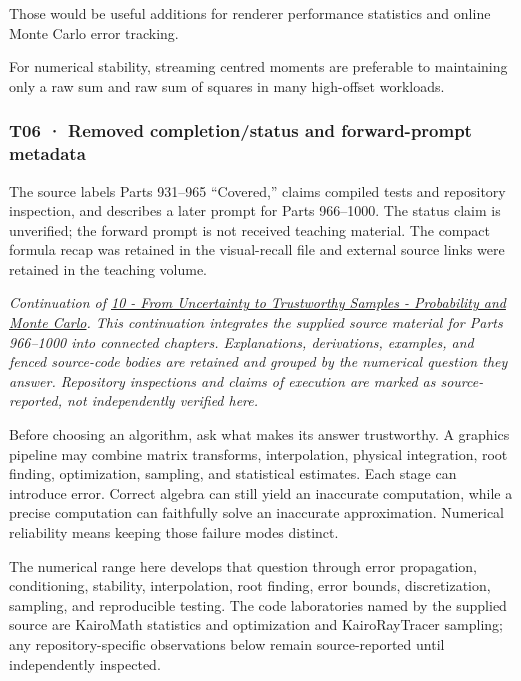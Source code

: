 Those would be useful additions for renderer performance statistics and online Monte Carlo error tracking.

For numerical stability, streaming centred moments are preferable to maintaining only a raw sum and raw sum of squares in many high-offset workloads.

\subsubsection{T06 · Removed completion/status and forward-prompt metadata}\label{02-foundations-ii-ch039-t06-removed-completionstatus-and-forward-prompt-metadata}

\hypertarget{02-foundations-ii-ch039-t06-removed-completionstatus-and-forward-prompt-metadata}{}

The source labels Parts 931--965 ``Covered,'' claims compiled tests and repository inspection, and describes a later prompt for Parts 966--1000. The status claim is unverified; the forward prompt is not received teaching material. The compact formula recap was retained in the visual-recall file and external source links were retained in the teaching volume.

\emph{Continuation of \hyperref[02-foundations-ii-ch039-learning-route]{10 - From Uncertainty to Trustworthy Samples - Probability and Monte Carlo}. This continuation integrates the supplied source material for Parts 966--1000 into connected chapters. Explanations, derivations, examples, and fenced source-code bodies are retained and grouped by the numerical question they answer. Repository inspections and claims of execution are marked as source-reported, not independently verified here.}

Before choosing an algorithm, ask what makes its answer trustworthy. A graphics pipeline may combine matrix transforms, interpolation, physical integration, root finding, optimization, sampling, and statistical estimates. Each stage can introduce error. Correct algebra can still yield an inaccurate computation, while a precise computation can faithfully solve an inaccurate approximation. Numerical reliability means keeping those failure modes distinct.

The numerical range here develops that question through error propagation, conditioning, stability, interpolation, root finding, error bounds, discretization, sampling, and reproducible testing. The code laboratories named by the supplied source are KairoMath statistics and optimization and KairoRayTracer sampling; any repository-specific observations below remain source-reported until independently inspected.

